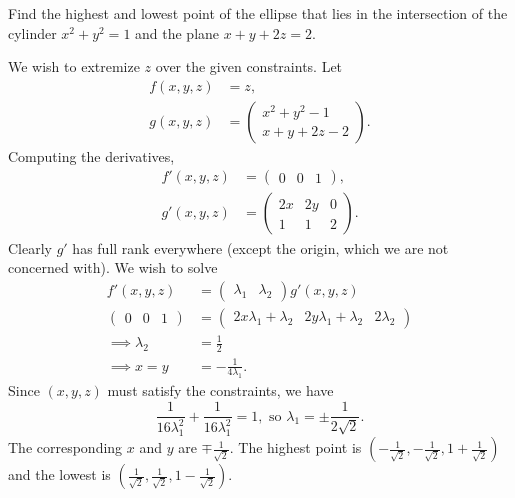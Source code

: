 \begin{example}
    Find the highest and lowest point of the ellipse that lies in the
    intersection of the cylinder $x^2 + y^2 = 1$ and the plane
    $x + y + 2z = 2$.

    We wish to extremize $z$ over the given constraints.
    Let \begin{align*}
        f(x, y, z) &= z, \\
        g(x, y, z) &= \begin{pmatrix}
            x^2 + y^2 - 1 \\
            x + y + 2z - 2
        \end{pmatrix}.
    \end{align*}
    Computing the derivatives, \begin{align*}
        f'(x, y, z) &= \begin{pmatrix}
            0 & 0 & 1
        \end{pmatrix}, \\
        g'(x, y, z) &= \begin{pmatrix}
            2x & 2y & 0 \\
            1 & 1 & 2
        \end{pmatrix}.
    \end{align*}
    Clearly $g'$ has full rank everywhere (except the origin, which we are
    not concerned with).
    We wish to solve \begin{align*}
        f'(x, y, z) &= \begin{pmatrix}
            \lambda_1 & \lambda_2
        \end{pmatrix} g'(x, y, z) \\
        \begin{pmatrix}
            0 & 0 & 1
        \end{pmatrix} &= \begin{pmatrix}
            2x \lambda_1 + \lambda_2 & 2y \lambda_1 + \lambda_2 & 2 \lambda_2
        \end{pmatrix} \\
        \implies \lambda_2 &= \frac12 \\
        \implies x = y &= - \frac1{4\lambda_1}.
    \end{align*}
    Since $(x, y, z)$ must satisfy the constraints, we have \[
        \frac1{16\lambda_1^2} + \frac1{16\lambda_1^2} = 1,
        \text{ so } \lambda_1 = \pm\frac1{2\sqrt 2}.
    \] The corresponding $x$ and $y$ are $\mp \frac1{\sqrt 2}$.
    The highest point is
    $(-\frac1{\sqrt 2}, -\frac1{\sqrt 2}, 1 + \frac1{\sqrt 2})$
    and the lowest is
    $(\frac1{\sqrt 2}, \frac1{\sqrt 2}, 1 - \frac1{\sqrt 2})$.
\end{example}

